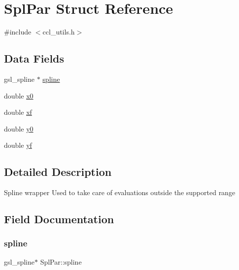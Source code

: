 \hypertarget{struct_spl_par}{}\section{Spl\+Par Struct Reference}
\label{struct_spl_par}


{\ttfamily \#include $<$ccl\+\_\+utils.\+h$>$}

\subsection*{Data Fields}
\begin{DoxyCompactItemize}
\item 
gsl\+\_\+spline $\ast$ \mbox{\hyperlink{struct_spl_par_ae8f88172b1b5531e97049f3996734d61}{spline}}
\item 
double \mbox{\hyperlink{struct_spl_par_a13c74ee83d8d7f138bac671adaa7cf74}{x0}}
\item 
double \mbox{\hyperlink{struct_spl_par_a81d8596b683922ed144fd8766e01f3f3}{xf}}
\item 
double \mbox{\hyperlink{struct_spl_par_a49d3136602dec3eff0bfd5c631615cb0}{y0}}
\item 
double \mbox{\hyperlink{struct_spl_par_a3e483146b3649beeaa42e854f7b7a386}{yf}}
\end{DoxyCompactItemize}


\subsection{Detailed Description}
Spline wrapper Used to take care of evaluations outside the supported range 

\subsection{Field Documentation}
\mbox{\label{struct_spl_par_ae8f88172b1b5531e97049f3996734d61}} 
\subsubsection{\texorpdfstring{spline}{spline}}
{\footnotesize\ttfamily gsl\+\_\+spline$\ast$ Spl\+Par\+::spline}

\mbox{\label{struct_spl_par_a13c74ee83d8d7f138bac671adaa7cf74}} 
